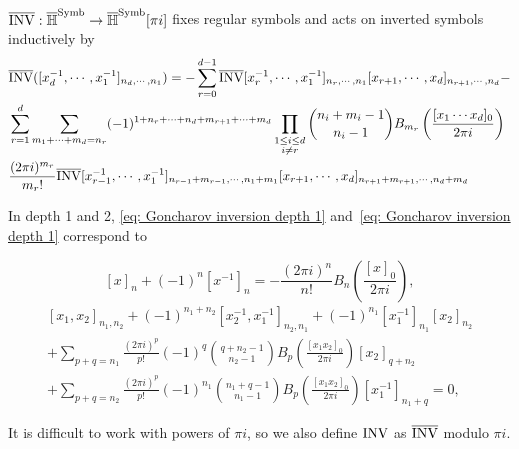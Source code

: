 \begin{definition}
 $\overline{\operatorname{INV}}:\overline{\mathbb H}^{\operatorname{Symb}}\to\overline{\mathbb H}^{\operatorname{Symb}}[\pi i]$ fixes regular symbols and acts on inverted symbols inductively by
\begin{equation}\label{eq: INVbar}
\begin{aligned}
&\overline{\operatorname{INV}}([x_d^{-1},\cdots,x_1^{-1}]_{n_d,\cdots,n_1})=-\sum_{r=0}^{d-1}\overline{\operatorname{INV}}[x_r^{-1},\cdots,x_1^{-1}]_{n_r,\cdots,n_1}[x_{r+1},\cdots,x_d]_{n_{r+1},\cdots,n_d}-\\
&\sum_{r=1}^d\sum_{m_1+\cdots+m_d=n_r}(-1)^{1+n_r+\cdots+n_d+m_{r+1}+\cdots+m_d}\prod_{\substack{1\leq i\leq d\\i\neq r}}\binom{n_i+m_i-1}{n_i-1}B_{m_r}\left(\frac{[x_1\cdots x_d]_0}{2\pi i}\right)\\
&\frac{(2\pi i)^{m_r}}{m_r!}\overline{\operatorname{INV}}[x_{r-1}^{-1},\cdots,x_1^{-1}]_{n_{r-1}+m_{r-1},\cdots,n_1+m_1}[x_{r+1},\cdots,x_d]_{n_{r+1}+m_{r+1},\cdots,n_d+m_d}
\end{aligned}
\end{equation}
\end{definition}

In depth 1 and 2, \eqref{eq: Goncharov inversion depth 1} and~\eqref{eq: Goncharov inversion depth 1} correspond to

\begin{equation}\label{eq: Depth1Inv}
[x]_n+(-1)^{n}[x^{-1}]_n=-\frac{(2\pi i)^n}{n!}B_n\left(\frac{[x]_0}{2\pi i}\right),
\end{equation}
\begin{equation}\label{eq: Depth2Inv}
\begin{aligned}
[x_1,x_2]_{n_1,n_2}+(-1)^{n_1+n_2}[x_2^{-1},x_1^{-1}]_{n_2,n_1}+(-1)^{n_1}[x_1^{-1}]_{n_1}[x_2]_{n_2}\\
+\sum_{p+q=n_1}\frac{(2\pi i)^p}{p!}(-1)^q\binom{q+n_2-1}{n_2-1}B_p\left(\frac{[x_1x_2]_0}{2\pi i}\right)[x_2]_{q+n_2}\\
+\sum_{p+q=n_2}\frac{(2\pi i)^p}{p!}(-1)^{n_1}\binom{n_1+q-1}{n_1-1}B_p\left(\frac{[x_1x_2]_0}{2\pi i}\right)[x_1^{-1}]_{n_1+q}=0,
\end{aligned}
\end{equation}

It is difficult to work with powers of $\pi i$, so we also define $\operatorname{INV}$ as $\overline{\operatorname{INV}}$ modulo $\pi i$.


